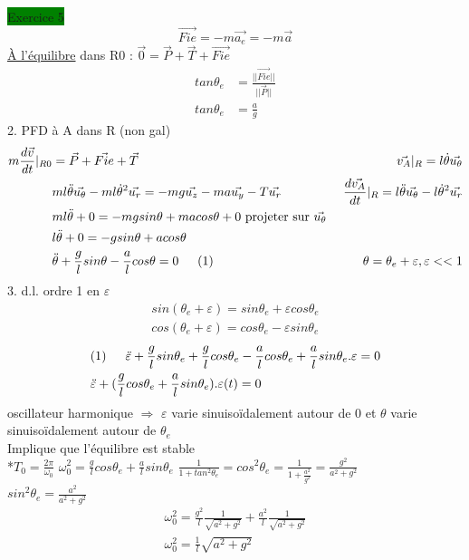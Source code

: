 \documentclass[a4paper,twocolumn,landscape]{article}
\begin{document}
\noindent \colorbox{green}{Exercice 5}\\
\begin{equation*}
    \vec{Fie} = -m\vec{a_e} = -m\vec{a}
\end{equation*}
\underline{À l'équilibre} dans R0 : \(\vec{0} = \vec{P} + \vec{T} + \vec{Fie}\)\\
\begin{align*}
    tan\theta_e &= \frac{||\vec{Fie}||}{||\vec{P}||}\\
    tan\theta_e &= \frac{a}{g}
\end{align*}
2. PFD à A dans R (non gal)\begin{align*}
    m\frac{d\vec{v}}{dt}|_{R0} &= \vec{P} + \vec{Fie} + \vec{T} &\vec{v_A}|_{R} = l\dot{\theta}\vec{u_\theta}\\
    &ml\ddot{\theta}\vec{u_\theta} - ml\dot{\theta}^2\vec{u_r} = -mg \vec{u_z} - ma\vec{u_y} - T\vec{u_r} &\frac{d\vec{v_A}}{dt}|_{R} = l\ddot{\theta}\vec{u_\theta} - l\dot{\theta}^2\vec{u_r}\\
    &ml\ddot{\theta} + 0 = -mg sin\theta + macos\theta + 0 \text{ projeter sur \(\vec{u_\theta}\) }\\
    &l\ddot{\theta} + 0 = -g sin\theta + acos\theta \\
    & \ddot{\theta} + \frac{g}{l}sin\theta - \frac{a}{l}cos\theta = 0 \indent(1)& \theta = \theta_e + \varepsilon, \varepsilon << 1
\end{align*}
3. d.l. ordre 1 en \(\varepsilon\) \begin{align*}
    sin(\theta_e + \varepsilon) = sin\theta_e + \varepsilon cos\theta_e\\
    cos(\theta_e + \varepsilon) = cos\theta_e - \varepsilon sin\theta_e
\end{align*}
\begin{align*}
    &(1) \indent \ddot{\varepsilon} + \frac{g}{l}sin\theta_e + \frac{g}{l}cos\theta_e - \frac{a}{l}cos\theta_e + \frac{a}{l}sin\theta_e.\varepsilon = 0\\
    &\ddot{\varepsilon} + (\frac{g}{l}cos\theta_e + \frac{a}{l}sin\theta_e).\varepsilon(t) = 0
\end{align*}
oscillateur harmonique \(\Rightarrow\)
\(\varepsilon\) varie sinuisoïdalement autour de 0 et \(\theta\) varie sinuisoïdalement autour de \(\theta_e\)\\
Implique que l'équilibre est stable\\
*\(T_0 = \frac{2\pi}{\omega_0}\)
\(\omega_0^2 = \frac{g}{l}cos\theta_e + \frac{a}{l}sin\theta_e\)
\(\frac{1}{1+tan^2\theta_e} = cos^2\theta_e = \frac{1}{1+\frac{a^2}{g^2}} = \frac{g^2}{a^2 + g^2}\)\\
\(sin^2\theta_e = \frac{a^2}{a^2+g^2}\)
\begin{eqnarray*}
    \omega_0^2 = \frac{g^2}{l}\frac{1}{\sqrt{a^2+g^2}} + \frac{a^2}{l}\frac{1}{\sqrt{a^2 + g^2}}\\
    \omega_0^2 = \frac{1}{l}\sqrt{a^2+g^2}
\end{eqnarray*}
\end{document}
